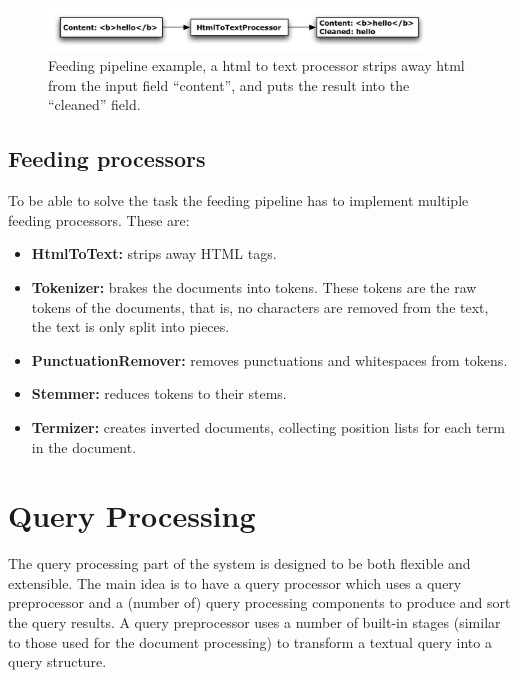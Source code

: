 \begin{figure}[htb]
	\centering
	\includegraphics[width=0.9\textwidth]{include/processor.pdf}
	\caption[Feeding pipeline example]{Feeding pipeline example, a html to text processor strips away html from the input field ``content'', and puts the result into the ``cleaned'' field.}\label{fig:feeding_processor}
\end{figure}

\subsection{Feeding processors}\label{sub:implemented_feeding_processors}
To be able to solve the task the feeding pipeline has to implement multiple feeding processors. These are:

\begin{itemize}
	\item \textbf{HtmlToText:} strips away HTML tags.
	\item \textbf{Tokenizer:} brakes the documents into tokens. These tokens are the raw tokens of the documents, that is, no characters are removed from the text, the text is only split into pieces.
	\item \textbf{PunctuationRemover:} removes punctuations and whitespaces from tokens. 
	\item \textbf{Stemmer:} reduces tokens to their stems. 
	\item \textbf{Termizer:} creates inverted documents, collecting position lists for each term in the document.
\end{itemize}

\section{Query Processing}
The query processing part of the system is designed to be both flexible and extensible. The main idea is to have a query processor which uses a query preprocessor and a (number of) query processing components to produce and sort the query results. A query preprocessor uses a number of built-in stages (similar to those used for the document processing) to transform a textual query into a query structure.


